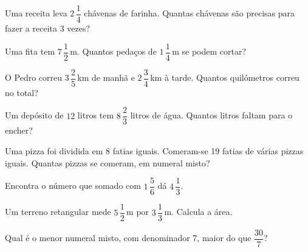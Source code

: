 \documentclass[12pt]{article}
\begin{document}
\begin{exercicios}
  \item Uma receita leva $2\,\dfrac{1}{4}$ chávenas de farinha. Quantas chávenas são precisas para fazer a receita 3 vezes?
  \item Uma fita tem $7\,\dfrac{1}{2}$\,m. Quantos pedaços de $1\,\dfrac{1}{4}$\,m se podem cortar?
  \item O Pedro correu $3\,\dfrac{2}{5}$\,km de manhã e $2\,\dfrac{3}{4}$\,km à tarde. Quantos quilómetros correu no total?
  \item Um depósito de $12$ litros tem $8\,\dfrac{2}{3}$ litros de água. Quantos litros faltam para o encher?
  \item Uma pizza foi dividida em 8 fatias iguais. Comeram-se 19 fatias de várias pizzas iguais. Quantas pizzas se comeram, em numeral misto?
  \item Encontra o número que somado com $1\,\dfrac{5}{6}$ dá $4\,\dfrac{1}{3}$.
  \item Um terreno retangular mede $5\,\dfrac{1}{2}$\,m por $3\,\dfrac{1}{3}$\,m. Calcula a área.
  \item Qual é o menor numeral misto, com denominador 7, maior do que $\dfrac{30}{7}$?
\end{exercicios}
\end{document}
